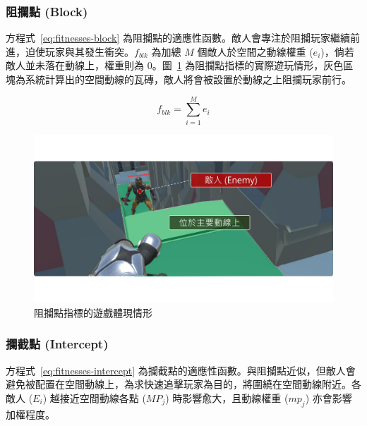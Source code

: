 \subsubsection{阻攔點 (Block)}
\label{sssec:method-segments-fitnesses-block}

方程式~\ref{eq:fitnesses-block} 為阻攔點的適應性函數。敵人會專注於阻攔玩家繼續前進，迫使玩家與其發生衝突。$f_{blk}$ 為加總 $M$ 個敵人於空間之動線權重 ($e_{i}$)，倘若敵人並未落在動線上，權重則為 $0$。圖~\ref{fig:fitnesses-block-gameplay} 為阻攔點指標的實際遊玩情形，灰色區塊為系統計算出的空間動線的瓦磚，敵人將會被設置於動線之上阻攔玩家前行。

\begin{equation}
    \label{eq:fitnesses-block}
    f_{blk} = \sum_{i=1}^{M} e_{i}
\end{equation}

\begin{figure}[!htb]
  \begin{center}
    \includegraphics[width=1.0\textwidth]{figures/fitnesses-block-gameplay.pdf}
    \caption{阻攔點指標的遊戲體現情形}
    \label{fig:fitnesses-block-gameplay}
  \end{center}
\end{figure}

\subsubsection{攔截點 (Intercept)}
\label{sssec:method-segments-fitnesses-intercept}

方程式~\ref{eq:fitnesses-intercept} 為攔截點的適應性函數。與阻攔點近似，但敵人會避免被配置在空間動線上，為求快速追擊玩家為目的，將圍繞在空間動線附近。各敵人 ($E_{i}$) 越接近空間動線各點 ($MP_{j}$) 時影響愈大，且動線權重 ($mp_{j}$) 亦會影響加權程度。

